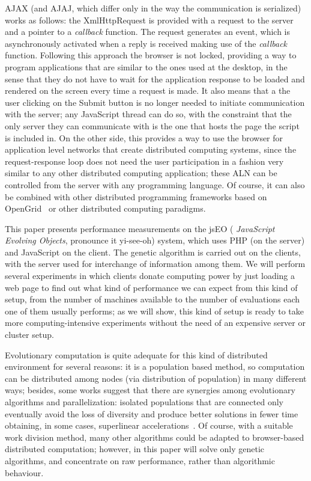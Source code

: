 \documentclass[runningheads,a4paper]{llncs}
\begin{document}
AJAX (and AJAJ, which differ only in the way the communication is
serialized) works as follows: the {\sf XmlHttpRequest} is provided 
with a request to the server and a pointer to a {\em callback} function. 
The request generates an event, which is asynchronously activated when a
reply is received  making use of the
 {\em callback} function. 
Following this approach the browser is not locked, providing a way to
program applications that are similar to  the ones used at the
desktop, in the sense that they do not have to wait for the
application response to be loaded
and rendered on the screen every time a request is made. It also means
that a the user clicking on the {\sf Submit} button is no longer
needed to initiate communication with the server; any JavaScript
thread can do so, with the constraint that the only server they can
communicate with is the one that hosts the page the script is included
in. On the other side, this provides a way to use the browser for application
level networks that create distributed computing systems,
since the request-response loop does not need the user participation in a
fashion very similar  to any other distributed computing application;
these ALN can be controlled from the server with any programming
language. Of course, it can also be combined with other distributed
programming frameworks based on OpenGrid~\cite{ogsa} or other
distributed computing paradigms. %


This paper presents performance measurements on the jsEO ({\em
  JavaScript Evolving Objects}, pronounce it yi-see-oh) system, which uses PHP 
 (on the server) and JavaScript on the client. The genetic algorithm is carried out  on the clients,
with the server used  for interchange of information among
them. We will perform several experiments in which clients donate
computing power by just loading a web page to find out what kind of
performance we can expect from this kind of setup, from the number of
machines available to the number of evaluations each one of them
usually performs; as we will show, this kind of setup is ready to take more
computing-intensive experiments without the need of an expensive server or cluster
setup. 

Evolutionary computation is quite adequate for this
kind of distributed environment for several reasons: it is a population based method,
so computation can be distributed among nodes (via distribution of
population) in many different ways;
besides, some works suggest that there are synergies among evolutionary
algorithms and parallelization: isolated populations that are
connected only eventually avoid the loss of diversity and produce
better solutions in fewer time obtaining, in some cases, superlinear
accelerations~\cite{cantu-paz:migration-policies}. Of course, with a suitable work division method, many other algorithms
could be adapted to browser-based distributed computation; however, in
this paper will solve only genetic algorithms, and concentrate on raw
performance, rather than algorithmic behaviour. 
\end{document}
